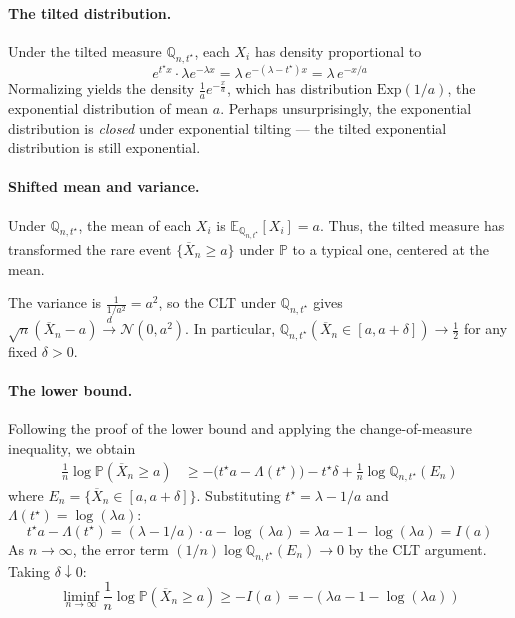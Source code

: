 \documentclass{article}
\newcommand{\E}{\mathbb{E}}
\renewcommand{\P}{\mathbb{P}}
\newcommand{\Q}{\mathbb{Q}}
\begin{document}
\paragraph{The tilted distribution.}
Under the tilted measure $\Q_{n,t^\star}$, each $X_i$ has density proportional to
\begin{equation}
  e^{t^\star x} \cdot \lambda e^{-\lambda x} = \lambda \, e^{-(\lambda - t^\star)x} = \lambda \, e^{-x/a}
\end{equation}
Normalizing yields the density $\frac{1}{a} e^{-\frac{x}{a}}$,
which has distribution $\text{Exp}(1/a)$, the exponential distribution of mean $a$.
Perhaps unsurprisingly, the exponential distribution is \emph{closed} under exponential tilting ---
the tilted exponential distribution is still exponential.

\paragraph{Shifted mean and variance.}
Under $\Q_{n,t^\star}$, the mean of each $X_i$ is $\E_{\Q_{n,t^\star}}[X_i] = a$. Thus, the tilted
measure has transformed the rare event $\{\overline{X}_n \ge a\}$ under $\P$ to a typical one,
centered at the mean.

The variance is $\frac{1}{1/a^2} = a^2$, so the CLT under $\Q_{n,t^\star}$ gives $\sqrt{n}(\overline{X}_n - a) \xrightarrow{d} \mathcal{N}(0, a^2)$.
In particular, $\Q_{n,t^\star}(\overline{X}_n \in [a, a + \delta]) \to \frac{1}{2}$
for any fixed $\delta > 0$.

\paragraph{The lower bound.}
Following the proof of the lower bound and applying the change-of-measure inequality, we obtain
\begin{align}
  \frac{1}{n} \log \P(\overline{X}_n \ge a)
  &\ge -\bigl(t^\star a - \Lambda(t^\star)\bigr) - t^\star \delta + \frac{1}{n} \log \Q_{n,t^\star}(E_n)
\end{align}
where $E_n = \{\overline{X}_n \in [a, a+\delta]\}$. Substituting $t^\star = \lambda - 1/a$ and $\Lambda(t^\star) = \log(\lambda a)$:
\begin{equation}
  t^\star a - \Lambda(t^\star) = (\lambda - 1/a) \cdot a - \log(\lambda a) = \lambda a - 1 - \log(\lambda a) = I(a)
\end{equation}
As $n \to \infty$, the error term $(1/n)\log \Q_{n,t^\star}(E_n) \to 0$ by the CLT argument. Taking $\delta \downarrow 0$:
\begin{equation}
  \liminf_{n \to \infty} \frac{1}{n} \log \P(\overline{X}_n \ge a) \ge -I(a) = -(\lambda a - 1 - \log(\lambda a))
\end{equation}
\end{document}

